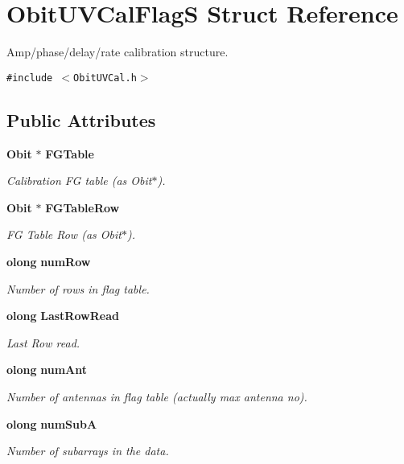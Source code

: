 \section{Obit\-UVCal\-Flag\-S Struct Reference}
\label{structObitUVCalFlagS}
Amp/phase/delay/rate calibration structure.  


{\tt \#include $<$Obit\-UVCal.h$>$}

\subsection*{Public Attributes}
\begin{CompactItemize}
\item 
{\bf Obit} $\ast$ {\bf FGTable}
\begin{CompactList}\small\item\em Calibration FG table (as Obit$\ast$). \item\end{CompactList}\item 
{\bf Obit} $\ast$ {\bf FGTable\-Row}
\begin{CompactList}\small\item\em FG Table Row (as Obit$\ast$). \item\end{CompactList}\item 
{\bf olong} {\bf num\-Row}
\begin{CompactList}\small\item\em Number of rows in flag table. \item\end{CompactList}\item 
{\bf olong} {\bf Last\-Row\-Read}
\begin{CompactList}\small\item\em Last Row read. \item\end{CompactList}\item 
{\bf olong} {\bf num\-Ant}
\begin{CompactList}\small\item\em Number of antennas in flag table (actually max antenna no). \item\end{CompactList}\item 
{\bf olong} {\bf num\-Sub\-A}
\begin{CompactList}\small\item\em Number of subarrays in the data. \item\end{CompactList}\item 

\end{CompactItemize}
